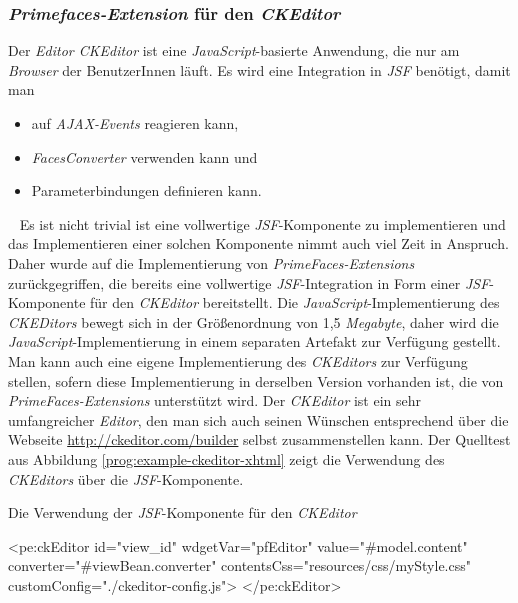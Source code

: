 \subsubsection{\emph{Primefaces-Extension} für den \emph{CKEditor}}
Der \emph{Editor CKEditor} ist eine \emph{JavaScript}-basierte Anwendung, die nur am \emph{Browser} der BenutzerInnen läuft. Es wird eine Integration in \emph{JSF} benötigt, damit man
\begin{itemize}
	\item auf \emph{AJAX-Events} reagieren kann,
	\item\emph{FacesConverter} verwenden kann und
	\item Parameterbindungen definieren kann.
\end{itemize}
\ \newline
Es ist nicht trivial ist eine vollwertige \emph{JSF}-Komponente zu implementieren und das Implementieren einer solchen Komponente nimmt auch viel Zeit in Anspruch. Daher wurde auf die Implementierung von \emph{PrimeFaces-Extensions} zurückgegriffen, die bereits eine vollwertige \emph{JSF}-Integration in Form einer \emph{JSF}-Komponente für den \emph{CKEditor} bereitstellt.
\newline
\newline
Die \emph{JavaScript}-Implementierung des \emph{CKEDitors} bewegt sich in der Größenordnung von 1,5 \emph{Megabyte}, daher wird die \emph{JavaScript}-Implementierung in einem separaten Artefakt zur Verfügung gestellt. Man kann auch eine eigene Implementierung des \emph{CKEditors} zur Verfügung stellen, sofern diese Implementierung in derselben Version vorhanden ist, die von \emph{PrimeFaces-Extensions} unterstützt wird. Der \emph{CKEditor} ist ein sehr umfangreicher \emph{Editor}, den man sich auch seinen Wünschen entsprechend über die Webseite \url{http://ckeditor.com/builder} selbst zusammenstellen kann.
\newline
\newline
Der Quelltest aus Abbildung \ref{prog:example-ckeditor-xhtml} zeigt die Verwendung des \emph{CKEditors} über die \emph{JSF}-Komponente.
\begin{program}[h]
\caption{Die Verwendung der \emph{JSF}-Komponente für den \emph{CKEditor}}
\label{prog:example-ckeditor-xhtml}
\begin{HtmlCode}
<pe:ckEditor id="view_id"
             wdgetVar="pfEditor"
             value="#{model.content}"
             converter="#{viewBean.converter}" 
             contentsCss="resources/css/myStyle.css"
             customConfig="./ckeditor-config.js">
</pe:ckEditor>
\end{HtmlCode}
\end{program}
